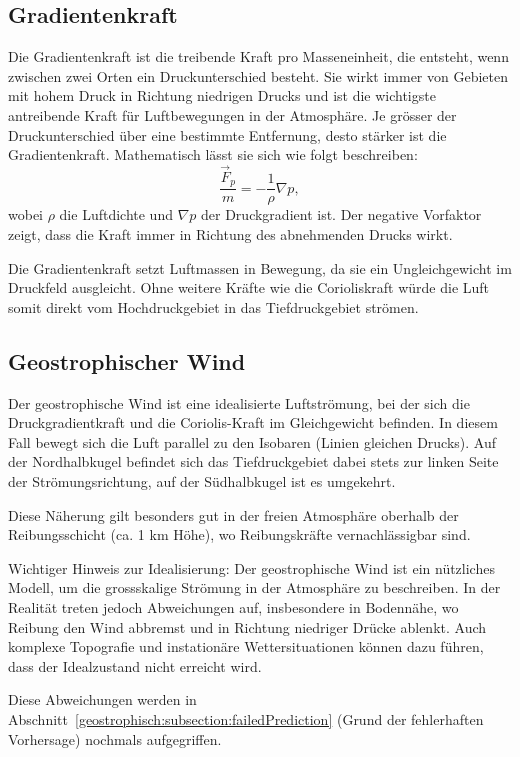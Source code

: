 \subsection{Gradientenkraft
\label{geostrophisch:subsection:gradient}}
Die Gradientenkraft ist die treibende Kraft pro Masseneinheit, die entsteht, wenn zwischen zwei Orten ein Druckunterschied besteht. Sie wirkt immer von Gebieten mit hohem Druck in Richtung niedrigen Drucks und ist die wichtigste antreibende Kraft für Luftbewegungen in der Atmosphäre. Je grösser der Druckunterschied über eine bestimmte Entfernung, desto stärker ist die Gradientenkraft.
Mathematisch lässt sie sich wie folgt beschreiben:
\begin{equation}
\frac{\vec{F}_p} {m}
= 
-\frac{1}{\rho} \nabla p
\label{geostrophisch:equation4},
\end{equation}
wobei $\rho$ die Luftdichte und $\nabla p$ der Druckgradient ist. 
Der negative Vorfaktor zeigt, dass die Kraft immer in Richtung des abnehmenden Drucks wirkt.

Die Gradientenkraft setzt Luftmassen in Bewegung, da sie ein Ungleichgewicht im Druckfeld ausgleicht. Ohne weitere Kräfte wie die Corioliskraft würde die Luft somit direkt vom Hochdruckgebiet in das Tiefdruckgebiet strömen.
\subsection{Geostrophischer Wind}

Der geostrophische Wind ist eine idealisierte Luftströmung, bei der sich die Druckgradientkraft und die Coriolis-Kraft im Gleichgewicht befinden. In diesem Fall bewegt sich die Luft parallel zu den Isobaren (Linien gleichen Drucks). Auf der Nordhalbkugel befindet sich das Tiefdruckgebiet dabei stets zur linken Seite der Strömungsrichtung, auf der Südhalbkugel ist es umgekehrt.

Diese Näherung gilt besonders gut in der freien Atmosphäre oberhalb der Reibungsschicht (ca. 1 km Höhe), wo Reibungskräfte vernachlässigbar sind. 


Wichtiger Hinweis zur Idealisierung:
Der geostrophische Wind ist ein nützliches Modell, um die grossskalige Strömung in der Atmosphäre zu beschreiben. In der Realität treten jedoch Abweichungen auf, insbesondere in Bodennähe, wo Reibung den Wind abbremst und in Richtung niedriger Drücke ablenkt. Auch komplexe Topografie und instationäre Wettersituationen können dazu führen, dass der Idealzustand nicht erreicht wird.

Diese Abweichungen werden in Abschnitt~\ref{geostrophisch:subsection:failedPrediction} (Grund der fehlerhaften Vorhersage) nochmals aufgegriffen.







